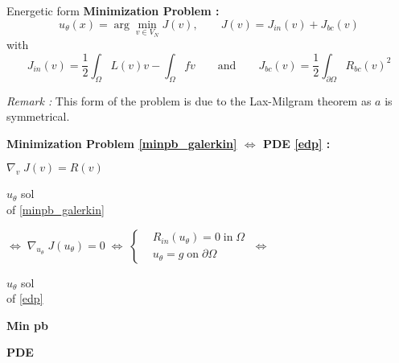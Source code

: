\begin{frame}{Energetic form}
	\textbf{Minimization Problem :}
	\begin{equation}
		u_\theta(x)=\arg\min_{v\in V_N} J(v), \qquad J(v)=J_{in}(v)+J_{bc}(v)\label{minpb_galerkin}
	\end{equation}
	with 
	\begin{equation*}
		J_{in}(v)=\frac{1}{2}\int_\Omega L(v)v - \int_\Omega fv  \qquad \text{and} \qquad J_{bc}(v)=\frac{1}{2}\int_{\partial\Omega} R_{bc}(v)^2
	\end{equation*}

	\footnotesize	
	\textit{Remark :} This form of the problem is due to the Lax-Milgram theorem as $a$ is symmetrical.
	\normalsize
	
	\footnotesize
	\begin{center}
		\begin{tcolorbox}[
			colback=white, %
			colframe=other, %
			arc=2mm, %
			boxrule=0.5pt, %
			breakable, enhanced jigsaw,
			width=0.8\linewidth
			]
			
			\textbf{Minimization Problem \eqref{minpb_galerkin} $\Leftrightarrow$ PDE \eqref{edp} :}
			
			\centering
			$\nabla_v \; J(v)=R(v) \qquad $  
			
			\vspace{5pt}
			
			\begin{minipage}{0.1\linewidth}
				\centering
				$u_\theta$ sol \\
				of \eqref{minpb_galerkin}
			\end{minipage} $\Leftrightarrow \; \nabla_{u_\theta} \; J(u_\theta)=0 \; \Leftrightarrow \; \left\{\begin{aligned}
				&R_{in}(u_\theta)=0 \; \text{in} \; \Omega \\
				&u_\theta=g \; \text{on} \; \partial\Omega
			\end{aligned}\right. \; \Leftrightarrow$ \begin{minipage}{0.1\linewidth}
				\centering
				$u_\theta$ sol \\
				of \eqref{edp}
			\end{minipage}
		
			\vspace{5pt}
			
			\begin{minipage}{0.1\linewidth}
				\centering
				\textbf{Min pb}
			\end{minipage} \; \hspace{150pt} \; \begin{minipage}{0.1\linewidth}
				\centering
				\textbf{PDE}
			\end{minipage}
		\end{tcolorbox}
	\end{center}
\end{frame}

